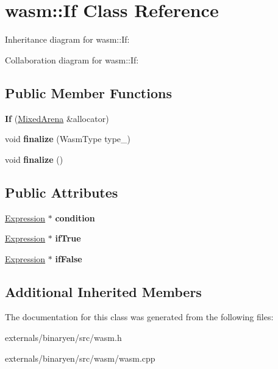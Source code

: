 \hypertarget{classwasm_1_1_if}{}\section{wasm\+:\+:If Class Reference}
\label{classwasm_1_1_if}


Inheritance diagram for wasm\+:\+:If\+:


Collaboration diagram for wasm\+:\+:If\+:
\subsection*{Public Member Functions}
\begin{DoxyCompactItemize}
\item 
\mbox{\label{classwasm_1_1_if_a5cf69139cbb545f5f618ebd17cf044dd}} 
{\bfseries If} (\mbox{\hyperlink{struct_mixed_arena}{Mixed\+Arena}} \&allocator)
\item 
\mbox{\label{classwasm_1_1_if_aab7d2967ce4044eb17e96adaa1fbf7db}} 
void {\bfseries finalize} (Wasm\+Type type\+\_\+)
\item 
\mbox{\label{classwasm_1_1_if_a4b90d1f389fde5a42ba3fad86f5671e4}} 
void {\bfseries finalize} ()
\end{DoxyCompactItemize}
\subsection*{Public Attributes}
\begin{DoxyCompactItemize}
\item 
\mbox{\label{classwasm_1_1_if_ab1019103c0996c46ded9f9d270e44b72}} 
\mbox{\hyperlink{classwasm_1_1_expression}{Expression}} $\ast$ {\bfseries condition}
\item 
\mbox{\label{classwasm_1_1_if_a3005c384a54c15879b8b96a45321d25b}} 
\mbox{\hyperlink{classwasm_1_1_expression}{Expression}} $\ast$ {\bfseries if\+True}
\item 
\mbox{\label{classwasm_1_1_if_a06374af67a8a057eeb79c9b094864114}} 
\mbox{\hyperlink{classwasm_1_1_expression}{Expression}} $\ast$ {\bfseries if\+False}
\end{DoxyCompactItemize}
\subsection*{Additional Inherited Members}


The documentation for this class was generated from the following files\+:\begin{DoxyCompactItemize}
\item 
externals/binaryen/src/wasm.\+h\item 
externals/binaryen/src/wasm/wasm.\+cpp\end{DoxyCompactItemize}
